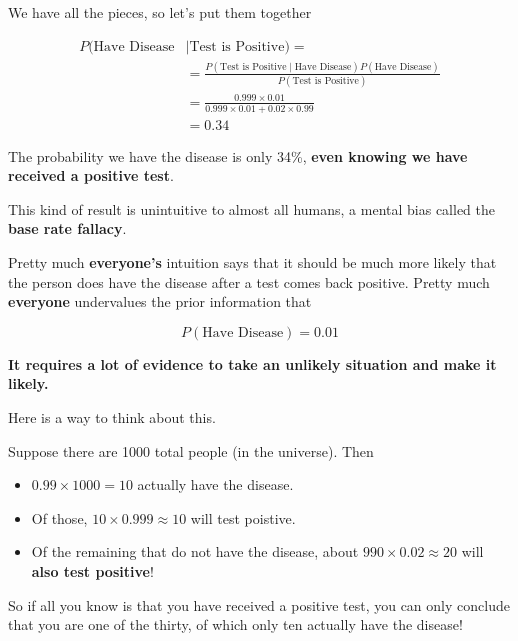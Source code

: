 \begin{frame}

We have all the pieces, so let's put them together

\begin{align*}
P(\text{Have Disease}  & \mid \text{Test is Positive}) = \\
%
&= \frac{  P(\text{Test is
Positive} \mid \text{Have Disease}) P(\text{Have Disease}) } { P(\text{Test is
Positive}) } \\
%
&= \frac{ 0.999 \times 0.01 } {  0.999 \times 0.01 +  0.02 \times 0.99 } \\
%
&= 0.34
\end{align*}

The probability we have the disease is only 34\%, \textbf{even knowing we
have received a positive test}.

\end{frame}
%

%
\begin{frame}

This kind of result is unintuitive to almost all humans, a mental bias called the
\textbf{base rate fallacy}.

\end{frame}
%

%
\begin{frame}

Pretty much \textbf{everyone's} intuition says that it should be much more
likely that the person does have the disease after a test comes back positive.
Pretty much \textbf{everyone} undervalues the prior information that

$$ P(\text{Have Disease}) = 0.01 $$

\textbf{It requires a lot of evidence to take an unlikely situation and make it
likely.}

\end{frame}
%

%
\begin{frame}

Here is a way to think about this.

Suppose there are 1000 total people (in the universe).  Then

\begin{itemize}
  \item $0.99 \times 1000 = 10$ actually have the disease.
  \item Of those, $10 \times 0.999 \approx 10$ will test poistive.
  \item Of the remaining that do not have the disease, about $990 \times 0.02 \approx 20$ will \textbf{also test positive}!
\end{itemize}

So if all you know is that you have received a positive test, you can only conclude that you are one of the thirty, of which only ten actually have the disease!

\end{frame}
%

